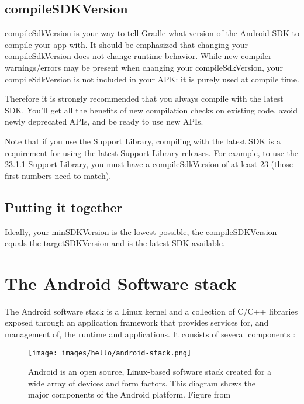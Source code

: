 \subsection{compileSDKVersion}
compileSdkVersion is your way to tell Gradle what version of the Android SDK to compile your app with.
It should be emphasized that changing your compileSdkVersion does not change runtime behavior.
While new compiler warnings/errors may be present when changing your compileSdkVersion, your compileSdkVersion is not included in your APK: it is purely used at compile time.

Therefore it is strongly recommended that you always compile with the latest SDK.
You’ll get all the benefits of new compilation checks on existing code, avoid newly deprecated APIs, and be ready to use new APIs.

Note that if you use the Support Library, compiling with the latest SDK is a requirement for using the latest Support Library releases.
For example, to use the 23.1.1 Support Library, you must have a compileSdkVersion of at least 23 (those first numbers need to match).

\subsection{Putting it together}
Ideally, your minSDKVersion is the lowest possible, the compileSDKVersion equals the targetSDKVersion and is the latest SDK available.

\section{The Android Software stack}
The Android software stack is a Linux kernel and a collection of C/C++ libraries exposed through an application framework that provides services for, and management of, the runtime and applications.
It consists of several components \cite{Google2017}:

\begin{figure}[ht]
	\centering
	\texttt{[image: images/hello/android-stack.png]}
	\label{fig:stack}
	\caption{Android is an open source, Linux-based software stack created for a wide array of devices and form factors.
			This diagram shows the major components of the Android platform. Figure from \cite{Google2017}}
\end{figure}

